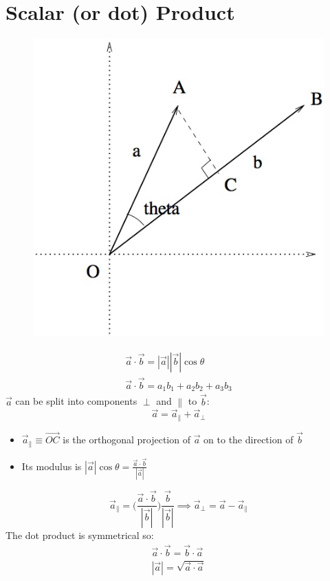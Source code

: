 \documentclass[a4paper, 11pt, normalem]{report}
\begin{document}
\section{Scalar (or dot) Product}
\begin{figure}
    \begin{center}
        \includegraphics[scale=0.5]{Scalar.jpg}
    \end{center}
\end{figure}
\begin{gather*}
    \vec{a} \cdot \vec{b} = |\vec{a}||\vec{b}|\cos\theta \\
    \vec{a} \cdot \vec{b} = a_{1}b_{1} + a_{2}b_{2} + a_{3}b_{3}
\end{gather*}
$\vec{a}$ can be split into components $\perp$ and $\parallel$ to $\vec{b}$:
\begin{equation*}
    \vec{a} = \vec{a}_{\parallel} + \vec{a}_{\perp}
\end{equation*}
\begin{itemize}
    \item $\vec{a}_{\parallel} \equiv \vec{OC}$ is the orthogonal projection of $\vec{a}$ on to the direction of $\vec{b}$
    \item Its modulus is $|\vec{a}|\cos\theta = \frac{\vec{a} \cdot \vec{b}}{|\vec{a}|}$
\end{itemize}
\begin{equation*}
    \vec{a}_{\parallel} = \Bigg(\frac{\vec{a} \cdot \vec{b}}{|\vec{b}|}\Bigg) \frac{\vec{b}}{|\vec{b}|} \implies \vec{a}_{\perp} = \vec{a} - \vec{a}_{\parallel}
\end{equation*}
The dot product is symmetrical so:
\begin{gather*}
    \vec{a} \cdot \vec{b} = \vec{b} \cdot \vec{a} \\
    |\vec{a}| = \sqrt{\vec{a} \cdot \vec{a}}
\end{gather*}
\end{document}
